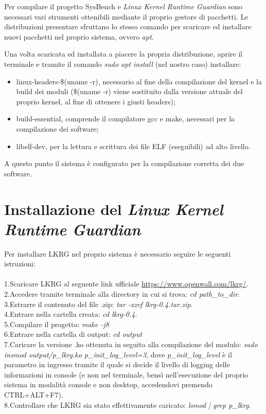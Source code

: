 

\label{AppendixA} %

Per compilare il progetto SysBench e \emph{Linux Kernel Runtime Guardian} sono necessari vari strumenti ottenibili mediante il proprio gestore di pacchetti. Le distribuzioni presentare sfruttano lo stesso comando per scaricare ed installare nuovi pacchetti nel proprio sistema, ovvero \emph{apt}.

Una volta scaricata ed installata a piacere la propria distribuzione, aprire il terminale e tramite il comando \emph{sudo apt install} (nel nostro caso) installare:

\begin{itemize}
\item linux-headers-\$(uname -r), necessario al fine della compilazione del kernel e la build dei moduli (\$(uname -r) viene sostituito dalla versione attuale del proprio kernel, al fine di ottenere i giusti headers);
\item build-essential, comprende il compilatore gcc e make, necessari per la compilazione dei software;
\item libelf-dev, per la lettura e scrittura dei file ELF (eseguibili) ad alto livello.
\end{itemize}

A questo punto il sistema è configurato per la compilazione corretta dei due software.

\section{Installazione del \emph{Linux Kernel Runtime Guardian}}

Per installare LKRG nel proprio sistema è necessario seguire le seguenti istruzioni:\\\\
1.Scaricare LKRG al seguente link ufficiale \url{https://www.openwall.com/lkrg/}. \\
2.Accedere tramite terminale alla directory in cui si trova: \emph{cd path\_to\_dir}.\\
3.Estrarre il contenuto del file .zip: \emph{tar -xzvf lkrg-0.4.tar.zip}.\\
4.Entrare nella cartella creata: \emph{cd lkrg-0.4}.\\
5.Compilare il progetto: \emph{make -j8}\\
6.Entrare nella cartella di output: \emph{cd output}\\
7.Caricare la versione .ko ottenuta in seguito alla compilazione del modulo: \emph{sudo insmod output/p\_lkrg.ko p\_init\_log\_level=3}, dove \emph{p\_init\_log\_level} è il parametro in ingresso tramite il quale si decide il livello di logging delle informazioni in console (e non nel terminale, bensì nell'esecuzione del proprio sistema in modalità console e non desktop, accedendovi premendo CTRL+ALT+F7).\\
8.Controllare che LKRG sia stato effettivamente caricato: \emph{lsmod | grep p\_lkrg}.\\

